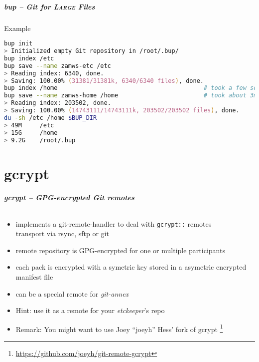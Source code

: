\documentclass[english,hyperref={pdfpagelabels=false},aspectratio=169]{beamer}
\begin{document}
\begin{frame}[fragile]
  \frametitle{bup -- Git for \textsc{Large} Files}
  \begin{block}{Example}
    \vspace{-0.75em}
    \begin{lstlisting}[language=zsh]
bup init
> Initialized empty Git repository in /root/.bup/
bup index /etc
bup save --name zamws-etc /etc
> Reading index: 6340, done.
> Saving: 100.00% (31381/31381k, 6340/6340 files), done.
bup index /home                                         # took a few seconds
bup save --name zamws-home /home                        # took about 3min
> Reading index: 203502, done.
> Saving: 100.00% (14743111/14743111k, 203502/203502 files), done.
du -sh /etc /home $BUP_DIR
> 49M     /etc
> 15G     /home
> 9.2G    /root/.bup
    \end{lstlisting}
    \vspace{-0.75em}
  \end{block}
\end{frame}


\part{gcrypt}
\makepart

\begin{frame}[label=gcrypt]
  \frametitle{gcrypt -- GPG-encrypted Git remotes}
  \framesubtitle{}
  \begin{itemize}
    \item implements a git-remote-handler to deal with \texttt{gcrypt::} remotes\\
      {\scriptsize transport via rsync, sftp or git}
    \item remote repository is GPG-encrypted for one or multiple participants
    \item each pack is encrypted with a symetric key stored in a asymetric encrypted manifest file
    \item can be a special remote for \textit{git-annex}
    \item Hint: use it as a remote for your \textit{etckeeper}'s repo
    \item Remark: You might want to use Joey ``joeyh'' Hess' fork of gcrypt
      \footnote{\tiny\url{https://github.com/joeyh/git-remote-gcrypt}}
  \end{itemize}
\end{frame}
\end{document}
